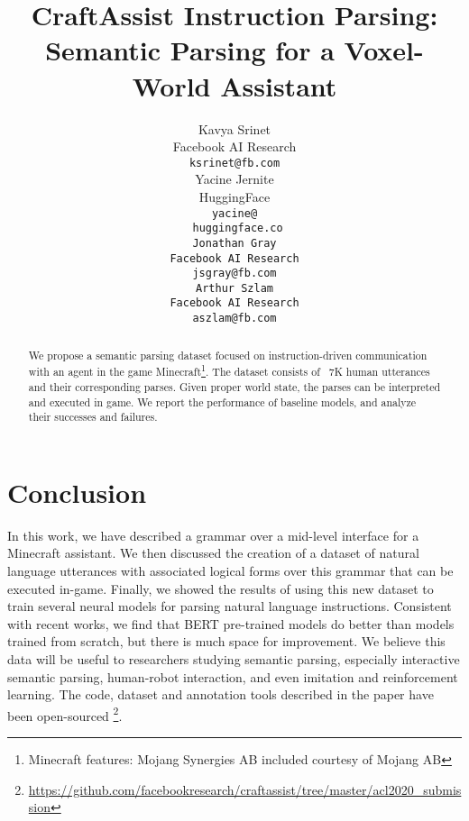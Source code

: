 \documentclass[11pt,a4paper]{article}
\title{CraftAssist Instruction Parsing: Semantic Parsing for a Voxel-World Assistant}
\author{Kavya Srinet\Thanks{ Equal contribution} \\
             {\normalsize{Facebook AI Research}}  \\
             \texttt{ksrinet@fb.com}  \\\And
  Yacine Jernite\printfnsymbol{1}\Thanks{ Work done while at Facebook AI Research} \\
  {\normalsize{HuggingFace}}  \\ 
  \tt{yacine@}\\
  \tt{ huggingface.co} \\\And
  Jonathan Gray \\
  {\normalsize{Facebook AI Research}}  \\
  \tt{jsgray@fb.com} \\\And
  Arthur Szlam \\
  {\normalsize{Facebook AI Research}} \\
  \tt{aszlam@fb.com} \\}
\date{}
\begin{document}
\maketitle
\begin{abstract}
We propose a semantic parsing dataset focused on instruction-driven communication with an agent in the game Minecraft\footnote{Minecraft features: \textcopyright Mojang Synergies AB included courtesy of Mojang AB}.  
The dataset consists of 
 ~7K human utterances and their corresponding parses.  Given proper world state, the parses can be interpreted and executed in game. 
We report the performance of baseline models, and analyze their successes and failures.
\end{abstract}








\section{Conclusion}
In this work, we have described a grammar over a mid-level interface for a Minecraft assistant. We then discussed the creation of a dataset of natural language utterances with associated logical forms over this grammar that can be executed in-game. Finally, we showed the results of using this new dataset to train several neural models for parsing natural language instructions.  %
Consistent with recent works, we find that BERT pre-trained models do better than models trained from scratch, but there is much space for improvement.
We believe this data will be useful to researchers studying semantic parsing, especially interactive semantic parsing, human-robot interaction, and even imitation and reinforcement learning. The code, dataset and annotation tools described in the paper have been open-sourced \footnote{\url{https://github.com/facebookresearch/craftassist/tree/master/acl2020_submission}}. 
\end{document}
